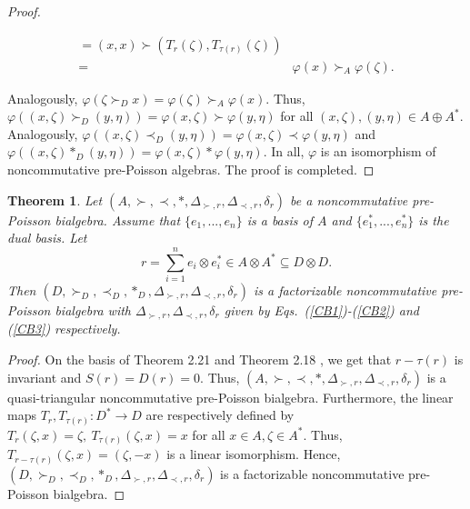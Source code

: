 \documentclass[12pt]{amsart}
\newtheorem{thm}{Theorem}[section]
\theoremstyle{definition}
\begin{document}
\begin{proof}
\begin{small}
\begin{align*}
=(x,x)\succ (T_{r}(\zeta),T_{\tau(r)}(\zeta))
\\=&\varphi(x)\succ_A \varphi(\zeta).
\end{align*}\end{small}
Analogously, $\varphi(\zeta\succ_D x)=\varphi(\zeta)\succ_A \varphi(x) $. Thus,
$\varphi((x,\zeta)\succ_D (y,\eta))=\varphi(x,\zeta)\succ \varphi(y,\eta) $ for all
$(x,\zeta), (y,\eta)\in A\oplus A^{*}$. Analogously, $\varphi((x,\zeta)\prec_D (y,\eta))=\varphi(x,\zeta)\prec \varphi(y,\eta) $
and
 $\varphi((x,\zeta)\ast_D (y,\eta))=\varphi(x,\zeta)\ast \varphi(y,\eta) $.
In all, $\varphi$ is an isomorphism of noncommutative pre-Poisson algebras.
The proof is completed.
\end{proof}

\begin{thm} \label{Ft}
Let $(A, \succ,\prec,\ast, \Delta_{\succ,r},  \Delta_{\prec,r},\delta_{r})$ be a noncommutative pre-Poisson
 bialgebra. Assume that $\{e_1,...,e_n\}$ is a basis of $A$ and $\{e^{*}_1,...,e^{*}_n\}$ is the dual basis.
 Let \begin{equation*}r=\sum_{i=1}^{n}e_{i}\otimes e_{i}^{*}\in A\otimes A^{*}\subseteq D\otimes D.\end{equation*}
Then $(D,\succ_D,\prec_D,\ast_D,\Delta_{\succ,r},  \Delta_{\prec,r},\delta_{r})$ 
 is a factorizable noncommutative pre-Poisson bialgebra with 
$\Delta_{\succ,r},  \Delta_{\prec,r},\delta_{r}$ given by Eqs.~(\ref{CB1})-(\ref{CB2}) and (\ref{CB3}) respectively.
\end{thm}

\begin{proof} On the basis of Theorem 2.21 \cite{Wa} and Theorem 2.18 \cite{Wbl}, we get that
$r-\tau(r)$ is invariant and $S(r)=D(r)=0$. Thus, 
$(A, \succ,\prec,\ast, \Delta_{\succ,r},  \Delta_{\prec,r},\delta_{r})$
is a quasi-triangular noncommutative pre-Poisson bialgebra.
 Furthermore, the linear maps $T_{r},T_{\tau(r)}:D^{*}\longrightarrow D$ are respectively defined by 
$T_{r}(\zeta,x)=\zeta,~T_{\tau(r)}(\zeta,x)=x$ for all $x\in A,\zeta\in A^{*}$. Thus,
$T_{r-\tau(r)}(\zeta,x)=(\zeta,-x)$ is a linear isomorphism. Hence, 
$(D,\succ_D,\prec_D,\ast_D,\Delta_{\succ,r},\Delta_{\prec,r},\delta_{r})$
is a factorizable noncommutative pre-Poisson bialgebra.
\end{proof}

\end{document}
